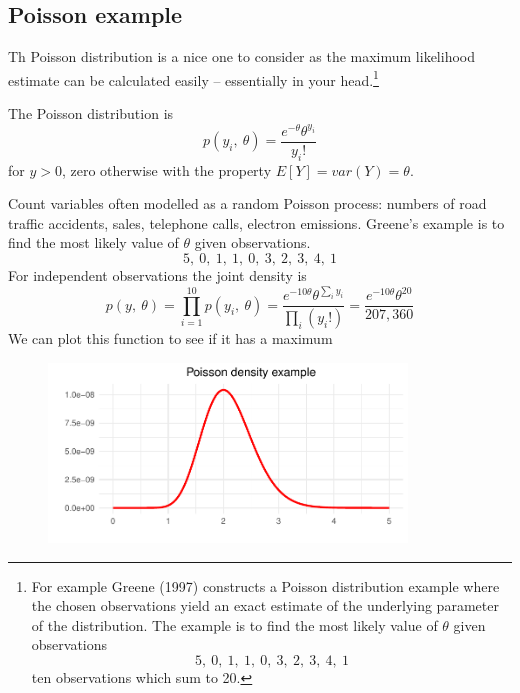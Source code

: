\documentclass[
  letterpaper,
]{book}
\begin{document}
\hypertarget{poisson-example}{%
\subsection{Poisson example}\label{poisson-example}}

Th Poisson distribution is a nice one to consider as the maximum
likelihood estimate can be calculated easily -- essentially in your
head.\footnote{For example Greene (1997) constructs a Poisson
  distribution example where the chosen observations yield an exact
  estimate of the underlying parameter of the distribution. The example
  is to find the most likely value of \(\theta\) given observations
  \begin{equation}
  5,\ 0,\ 1,\ 1,\ 0,\ 3,\ 2,\ 3,\ 4,\ 1
  \end{equation} ten observations which sum to 20.}

The Poisson distribution is \begin{equation}
 p(y_i,\ \theta )=\frac{e^{-\theta }\theta ^{y_i}}{y_i!}
\end{equation} for \(y>0\), zero otherwise with the property
\(E[Y]=var(Y)=\theta\).

Count variables often modelled as a random Poisson process: numbers of
road traffic accidents, sales, telephone calls, electron emissions.
Greene's example is to find the most likely value of \(\theta\) given
observations. \begin{equation}
5,\ 0,\ 1,\ 1,\ 0,\ 3,\ 2,\ 3,\ 4,\ 1
\end{equation} For independent observations the joint density is
\begin{equation}
p(y,\ \theta) =\prod_{i=1}^{10}p(y_i,\ \theta )
  = \frac{e^{-10\theta}\theta^{\sum_i y_i}}{\prod_i (y_i!)}
  = \frac{e^{-10\theta}\theta^{20}}{207,360}
\end{equation} We can plot this function to see if it has a maximum

\begin{figure}

{\centering \includegraphics[width=0.85\textwidth,height=\textheight]{CK_files/figure-pdf/dens-1.pdf}

}

\end{figure}
\end{document}
